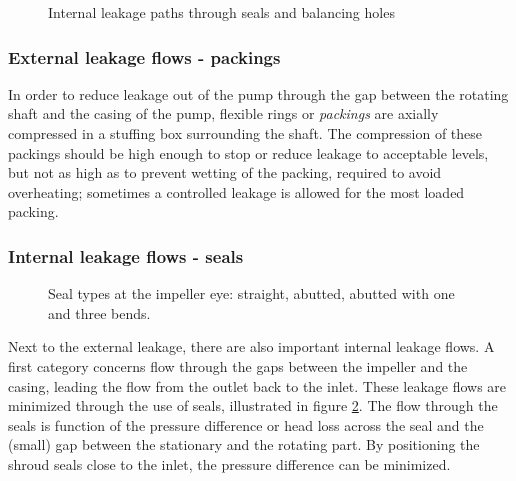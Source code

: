 \begin{figure}[!h]
  \caption{Internal leakage paths through seals and balancing holes}
  \label{fig:leakagePaths}
\end{figure}

\subsubsection{External leakage flows - packings}

In order to reduce leakage out of the pump through the gap between the
rotating shaft and the casing of the pump, flexible rings or
\emph{packings} are axially compressed in a stuffing box surrounding
the shaft. The compression of these packings should be high enough to
stop or reduce leakage to acceptable levels, but not as high as to
prevent wetting of the packing, required to avoid overheating;
sometimes a controlled leakage is allowed for the most loaded packing.

\subsubsection{Internal leakage flows - seals}

\begin{figure}[!h]
  \caption{Seal types at the impeller eye: straight, abutted, abutted
    with one and three bends.}
  \label{fig:seals}
\end{figure}

Next to the external leakage, there are also important internal
leakage flows. A first category concerns flow through the gaps between
the impeller and the casing, leading the flow from the outlet back to
the inlet. These leakage flows are minimized through the use of seals,
illustrated in figure \ref{fig:seals}. The flow through the seals is
function of the pressure difference or head loss across the seal and
the (small) gap between the stationary and the rotating part. By
positioning the shroud seals close to the inlet, the pressure
difference can be minimized.


